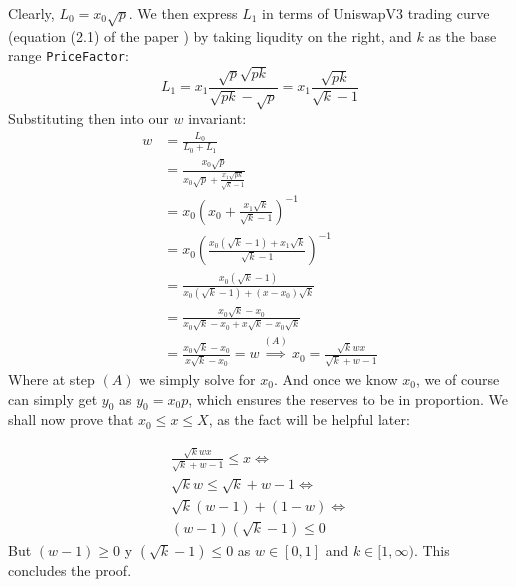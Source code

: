 \documentclass[11pt]{article}
\begin{document}
Clearly, $L_0 = x_0\sqrt p$. We then express $L_1$ in terms of UniswapV3
trading curve (equation (2.1) of the paper \cite{uniswapv3}) by taking
liqudity on the right, and $k$ as the base range \texttt{PriceFactor}:
\[
L_1 = x_1\frac{\sqrt{p}\sqrt{pk}}{\sqrt{pk}-\sqrt{p}}
    = x_1\frac{\sqrt{pk}}{\sqrt k - 1}
\]
Substituting then into our $w$ invariant:
\begin{equation*}
\begin{split}
w &= \frac{L_0}{L_0 + L_1}\\
  &= \frac{x_0\sqrt p}{x_0\sqrt p + \frac{x_1\sqrt{pk}}{\sqrt k - 1}}\\
  &= x_0\left({x_0 + \frac{x_1\sqrt{k}}{\sqrt k - 1}}\right)^{-1}\\
  &= x_0\left(
    \frac{x_0(\sqrt k - 1) + x_1\sqrt k}{\sqrt k - 1}
  \right)^{-1}\\
  &= \frac{x_0(\sqrt k -1)}{x_0(\sqrt k -1) + (x-x_0)\sqrt k}\\
  &= \frac{x_0\sqrt k - x_0}{x_0\sqrt k -x_0 + x\sqrt k - x_0\sqrt k}\\
  &= \frac{x_0\sqrt k - x_0}{x\sqrt k - x_0} =w
  \stackrel{(A)}\implies x_0 = \frac{\sqrt k wx}{\sqrt k + w - 1}
\end{split}
\end{equation*}
Where at step $(A)$ we simply solve for $x_0$. And once we know $x_0$,
we of course can simply get $y_0$ as $y_0 = x_0p$, which ensures the
reserves to be in proportion. We shall now prove that $x_0 \leq x \leq X$,
as the fact will be helpful later:

\begin{equation*}
\begin{split}
\frac{\sqrt k wx}{\sqrt k + w - 1}\leq x\iff\\
\sqrt k w\leq \sqrt k+w-1\iff\\
\sqrt k(w-1)+(1-w)\iff\\
(w-1)(\sqrt k-1)\leq 0
\end{split}
\end{equation*}
But $(w - 1) \geq 0$ y $(\sqrt k -1) \leq 0$ as $w\in[0, 1]$ and $k\in[1,
\infty)$. This concludes the proof.

\break
\end{document}

